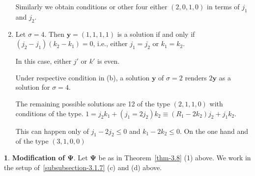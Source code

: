 \documentclass[a4paper,12pt]{article}
\theoremstyle{definition}
\theoremstyle{underlinethm}
\theoremstyle{definition}
\newtheorem{subsubsec}{}[subsection]
\begin{document}
\begin{enumerate}[label=(\alph*)]
Similarly we obtain conditions or other four either $(2,0,1,0)$ in terms of $j_{1}$ and $j_{2}$. 

\item Let $\sigma = 4$. Then $\mathbf{y} = (1,1,1,1)$ is a solution if and only if $\left(j_{2} -j_{1} \right)\left(k_{2}-k_{1}\right) = 0$, i.e., either $j_{1} =j_{2}$ or $k_{1}=k_{2}$.

In this case, either $j'$ or $k'$ is even. 

Under respective condition in (b), a solution $\mathbf{y}$ of $\sigma=2$ renders $2\mathbf{y}$ as a solution for $\sigma=4$. 

The remaining possible solutions are 12 of the type $(2,1,1,0)$ with conditions of the type. $1 = j_{2}k_{1} + (j_{1} =2j_{2})k_{2} \equiv (R_{1}-2k_{2})j_{2} + j_{1}k_{2}$.

This can happen only of $j_{1}-2j_{2} \leq 0$ and $k_{1} - 2k_{2} \leq 0$. On the one hand and of the type $(3,1,0,0)$

\end{enumerate}


\begin{subsubsec}\label{subsubsection-3.1.10}
\textbf{Modification of $\boldsymbol{\Psi}$}. Let $\boldsymbol{\Psi}$ be as in Theorem~\ref{thm-3.8} (1) above. We work in the setup of~\eqref{subsubsection-3.1.7} (c) and (d) above.
\end{subsubsec}
\end{document}
